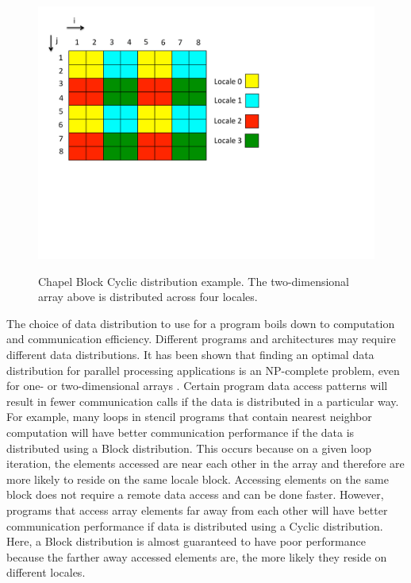 \begin{figure}
\begin{center}
\includegraphics[width=\linewidth]{./Figures/block_cyc_dist}
\renewcommand{\baselinestretch}{1}
\small\normalsize
\begin{quote}
\caption[Chapel Block Cyclic distribution]{Chapel Block Cyclic distribution example. The two-dimensional array above is distributed across four locales. \label{block_cyc_dist}}
\end{quote}
\end{center}
\end{figure}

The choice of data distribution to use for a program boils down to computation and communication efficiency. Different programs and architectures may require different data distributions. It has been shown that finding an optimal data distribution for parallel processing applications is an NP-complete problem, even for one- or two-dimensional arrays \cite{mace1987memory}. Certain program data access patterns will result in fewer communication calls if the data is distributed in a particular way. For example, many loops in stencil programs that contain nearest neighbor computation will have better communication performance if the data is distributed using a Block distribution. This occurs because on a given loop iteration, the elements accessed are near each other in the array and therefore are more likely to reside on the same locale block. Accessing elements on the same block does not require a remote data access and can be done faster. However, programs that access array elements far away from each other will have better communication performance if data is distributed using a Cyclic distribution. Here, a Block distribution is almost guaranteed to have poor performance because the farther away accessed elements are, the more likely they reside on different locales. 

